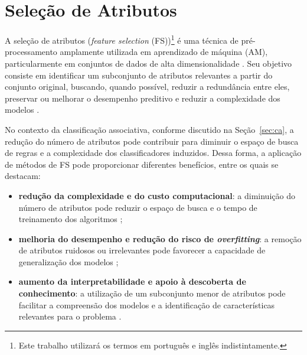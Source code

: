 \section{Seleção de Atributos}\label{sec:fs} 

A seleção de atributos (\textit{feature selection} (FS))\footnote{Este trabalho utilizará os termos em português e inglês indistintamente.} é uma técnica de pré-processamento amplamente utilizada em aprendizado de máquina (AM), particularmente em conjuntos de dados de alta dimensionalidade \cite{Dhal2022,10.1007/978-3-031-23092-9_12,BARBIERI2024123667}. Seu objetivo consiste em identificar um subconjunto de atributos relevantes a partir do conjunto original, buscando, quando possível, reduzir a redundância entre eles, preservar ou melhorar o desempenho preditivo e reduzir a complexidade dos modelos \cite{Theng2024,Emmoh2024}.

No contexto da classificação associativa, conforme discutido na Seção~\ref{sec:ca}, a redução do número de atributos pode contribuir para diminuir o espaço de busca de regras e a complexidade dos classificadores induzidos. Dessa forma, a aplicação de métodos de FS pode proporcionar diferentes benefícios, entre os quais se destacam:
\begin{itemize}
    \item \textbf{redução da complexidade e do custo computacional}: a diminuição do número de atributos pode reduzir o espaço de busca e o tempo de treinamento dos algoritmos \cite{Theng2024};

    \item \textbf{melhoria do desempenho e redução do risco de \textit{overfitting}}: a remoção de atributos ruidosos ou irrelevantes pode favorecer a capacidade de generalização dos modelos \cite{Dhal2022};

    \item \textbf{aumento da interpretabilidade e apoio à descoberta de conhecimento}: a utilização de um subconjunto menor de atributos pode facilitar a compreensão dos modelos e a identificação de características relevantes para o problema \cite{Dhal2022,KHAIRE20221060}.
\end{itemize}

